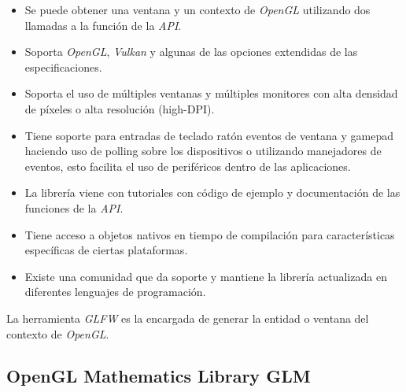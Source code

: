 \documentclass[a4paper]{book}
\begin{document}
\begin{itemize}
  \item Se puede obtener una ventana y un contexto de \textit{OpenGL} utilizando dos llamadas a la
  función de la \textit{API}.

  \item Soporta \textit{OpenGL}, \textit{Vulkan} y algunas de las opciones extendidas de las
  especificaciones.

  \item Soporta el uso de múltiples ventanas y múltiples monitores con alta densidad de
  píxeles o alta resolución (high-DPI).

  \item Tiene soporte para entradas de teclado ratón eventos de ventana y gamepad haciendo
  uso de polling sobre los dispositivos o utilizando manejadores de eventos, esto facilita
  el uso de periféricos dentro de las aplicaciones.

  \item La librería viene con tutoriales con código de ejemplo y documentación de las
  funciones de la \textit{API}.

  \item Tiene acceso a objetos nativos en tiempo de compilación para características específicas
  de ciertas plataformas.

  \item Existe una comunidad que da soporte y mantiene la librería actualizada en diferentes
  lenguajes de programación.

\end{itemize}

La herramienta \textit{GLFW} es la encargada de generar la entidad o ventana del contexto de \textit{OpenGL}. \cite{glfw:_docs}

\subsection{OpenGL Mathematics Library GLM}
\label{subsec:GLM}
\end{document}
